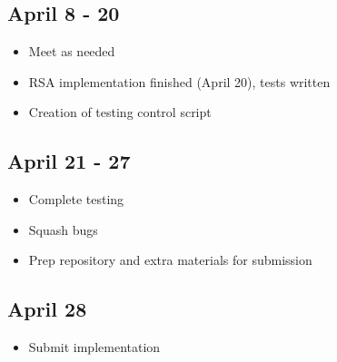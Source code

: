 \documentclass{article}
\begin{document}
    \subsection{April 8 - 20}
        \begin{itemize}
            \item Meet as needed
            \item RSA implementation finished (April 20), tests written
            \item Creation of testing control script
        \end{itemize}
    \subsection{April 21 - 27}
        \begin{itemize}
            \item Complete testing
            \item Squash bugs
            \item Prep repository and extra materials for submission
        \end{itemize}
    \subsection{April 28}
        \begin{itemize}
            \item Submit implementation
        \end{itemize}
\newpage

\end{document}
